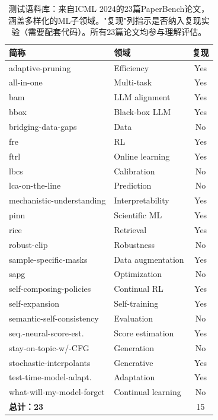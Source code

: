 \begin{table}[h]
\centering
\small
\begin{tabular}{llc}
\toprule
\textbf{简称} & \textbf{领域} & \textbf{复现} \\
\midrule
adaptive-pruning         & Efficiency         & Yes \\
all-in-one               & Multi-task         & Yes \\
bam                      & LLM alignment      & Yes \\
bbox                     & Black-box LLM      & Yes \\
bridging-data-gaps       & Data               & No  \\
fre                      & RL                 & Yes \\
ftrl                     & Online learning    & Yes \\
lbcs                     & Calibration        & No  \\
lca-on-the-line          & Prediction         & No  \\
mechanistic-understanding & Interpretability  & Yes \\
pinn                     & Scientific ML      & Yes \\
rice                     & Retrieval          & Yes \\
robust-clip              & Robustness         & No  \\
sample-specific-masks    & Data augmentation  & Yes \\
sapg                     & Optimization       & No  \\
self-composing-policies  & Continual RL       & Yes \\
self-expansion           & Self-training      & Yes \\
semantic-self-consistency & Evaluation        & No  \\
seq.-neural-score-est.   & Score estimation   & Yes \\
stay-on-topic-w/-CFG     & Generation         & No  \\
stochastic-interpolants  & Generative         & Yes \\
test-time-model-adapt.   & Adaptation         & Yes \\
what-will-my-model-forget & Continual learning & No  \\
\midrule
\textbf{总计：23}        &                    & 15 \\
\bottomrule
\end{tabular}
\caption{测试语料库：来自ICML 2024的23篇PaperBench论文，涵盖多样化的ML子领域。"复现"列指示是否纳入复现实验（需要配套代码）。所有23篇论文均参与理解评估。}
\label{tbl-corpus}
\end{table}

